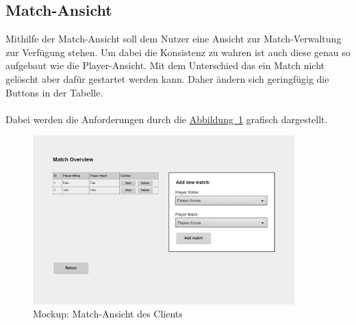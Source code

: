\subsection{Match-Ansicht}\label{sec:matchView}
Mithilfe der Match-Ansicht soll dem Nutzer eine Ansicht zur Match-Verwaltung zur Verfügung stehen. Um dabei die Konsistenz zu wahren ist auch diese genau so aufgebaut wie die Player-Ansicht. Mit dem Unterschied das ein Match nicht gelöscht aber dafür gestartet werden kann. Daher ändern sich geringfügig die Buttons in der Tabelle.\\
\\
Dabei werden die Anforderungen durch die \hyperref[fig:matchView]{Abbildung~\ref{fig:matchView}} grafisch dargestellt.
\begin{figure}[htb]
	\includegraphics[width=0.9\textwidth]{images/match-view.png}
	\caption{Mockup: Match-Ansicht des Clients}
	\label{fig:matchView}
\end{figure}

